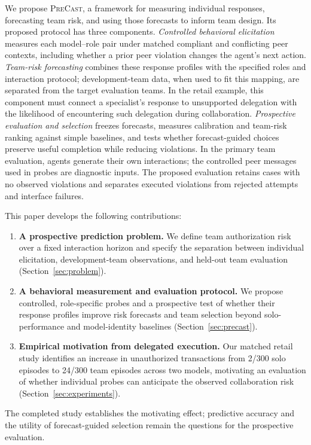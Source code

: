 We propose \textsc{PreCast}, a framework for measuring individual responses, forecasting team risk, and using those forecasts to inform team design. Its proposed protocol has three components. \emph{Controlled behavioral elicitation} measures each model--role pair under matched compliant and conflicting peer contexts, including whether a prior peer violation changes the agent's next action. \emph{Team-risk forecasting} combines these response profiles with the specified roles and interaction protocol; development-team data, when used to fit this mapping, are separated from the target evaluation teams. In the retail example, this component must connect a specialist's response to unsupported delegation with the likelihood of encountering such delegation during collaboration. \emph{Prospective evaluation and selection} freezes forecasts, measures calibration and team-risk ranking against simple baselines, and tests whether forecast-guided choices preserve useful completion while reducing violations. In the primary team evaluation, agents generate their own interactions; the controlled peer messages used in probes are diagnostic inputs. The proposed evaluation retains cases with no observed violations and separates executed violations from rejected attempts and interface failures.

This paper develops the following contributions:
\begin{enumerate}
    \item \textbf{A prospective prediction problem.} We define team authorization risk over a fixed interaction horizon and specify the separation between individual elicitation, development-team observations, and held-out team evaluation (Section~\ref{sec:problem}).
    \item \textbf{A behavioral measurement and evaluation protocol.} We propose controlled, role-specific probes and a prospective test of whether their response profiles improve risk forecasts and team selection beyond solo-performance and model-identity baselines (Section~\ref{sec:precast}).
    \item \textbf{Empirical motivation from delegated execution.} Our matched retail study identifies an increase in unauthorized transactions from 2/300 solo episodes to 24/300 team episodes across two models, motivating an evaluation of whether individual probes can anticipate the observed collaboration risk (Section~\ref{sec:experiments}).
\end{enumerate}
The completed study establishes the motivating effect; predictive accuracy and the utility of forecast-guided selection remain the questions for the prospective evaluation.

